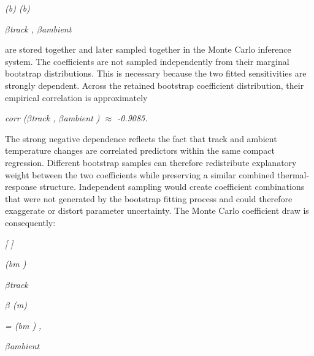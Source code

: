 \begin{center}\textit{(b)         (b)}\end{center}

\begin{center}\textit{\ensuremath{\beta}track , \ensuremath{\beta}ambient}\end{center}

are stored together and later sampled together in the Monte Carlo inference system. The coefficients are not sampled independently from their marginal bootstrap distributions. This is necessary because the two fitted sensitivities are strongly dependent. Across the retained bootstrap coefficient distribution, their empirical correlation is approximately

\begin{center}\textit{corr (\ensuremath{\beta}track , \ensuremath{\beta}ambient ) \ensuremath{\approx} -0.9085.}\end{center}

The strong negative dependence reflects the fact that track and ambient temperature changes are correlated predictors within the same compact regression. Different bootstrap samples can therefore redistribute explanatory weight between the two coefficients while preserving a similar combined thermal-response structure. Independent sampling would create coefficient combinations that were not generated by the bootstrap fitting process and could therefore exaggerate or distort parameter uncertainty. The Monte Carlo coefficient draw is consequently:

\begin{center}\textit{[      ]}\end{center}

\begin{center}\textit{(bm )}\end{center}

\begin{center}\textit{\ensuremath{\beta}track}\end{center}

\begin{center}\textit{\ensuremath{\beta}   (m)}\end{center}

\begin{center}\textit{= (bm )       ,}\end{center}

\begin{center}\textit{\ensuremath{\beta}ambient}\end{center}

